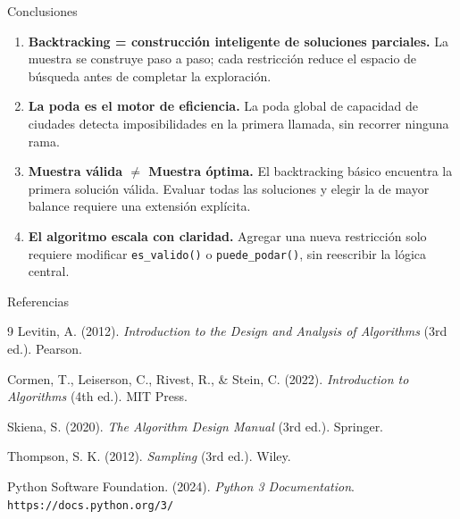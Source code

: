 \documentclass[aspectratio=169, 10pt]{beamer}
\begin{document}
\begin{frame}{Conclusiones}
  \begin{enumerate}
    \setlength\itemsep{0.4cm}

    \item \textbf{Backtracking = construcción inteligente de soluciones parciales.}
    La muestra se construye paso a paso; cada restricción reduce el espacio de búsqueda antes de completar la exploración.

    \item \textbf{La poda es el motor de eficiencia.}
    La poda global de capacidad de ciudades detecta imposibilidades en la primera llamada, sin recorrer ninguna rama.

    \item \textbf{Muestra válida $\neq$ Muestra óptima.}
    El backtracking básico encuentra la primera solución válida. Evaluar todas las soluciones y elegir la de mayor balance requiere una extensión explícita.

    \item \textbf{El algoritmo escala con claridad.}
    Agregar una nueva restricción solo requiere modificar \texttt{es\_valido()} o \texttt{puede\_podar()}, sin reescribir la lógica central.
  \end{enumerate}
\end{frame}

\begin{frame}{Referencias}
  \begin{thebibliography}{9}
      Levitin, A. (2012). \textit{Introduction to the Design and Analysis of Algorithms} (3rd ed.). Pearson.

      Cormen, T., Leiserson, C., Rivest, R., \& Stein, C. (2022). \textit{Introduction to Algorithms} (4th ed.). MIT Press.

      Skiena, S. (2020). \textit{The Algorithm Design Manual} (3rd ed.). Springer.

      Thompson, S. K. (2012). \textit{Sampling} (3rd ed.). Wiley.

      Python Software Foundation. (2024). \textit{Python 3 Documentation}. \texttt{https://docs.python.org/3/}
  \end{thebibliography}
\end{frame}


\appendix
\end{document}
